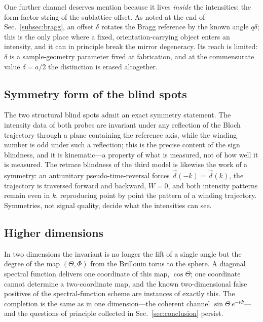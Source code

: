 \documentclass[onecolumn,aps,prl,superscriptaddress,longbibliography]{revtex4-2}
\begin{document}
One further channel deserves mention because it lives \emph{inside} the intensities: the form-factor string of the sublattice offset. As noted at the end of Sec.~\ref{subsec:bragg}, an offset $\delta$ rotates the Bragg reference by the known angle $q\delta$; this is the only place where a fixed, orientation-carrying object enters an intensity, and it can in principle break the mirror degeneracy. Its reach is limited: $\delta$ is a sample-geometry parameter fixed at fabrication, and at the commensurate value $\delta=a/2$ the distinction is erased altogether.

\subsection{Symmetry form of the blind spots}\label{subsec:symmetry}

The two structural blind spots admit an exact symmetry statement. The intensity data of both probes are invariant under any reflection of the Bloch trajectory through a plane containing the reference axis, while the winding number is odd under such a reflection; this is the precise content of the sign blindness, and it is kinematic---a property of what is measured, not of how well it is measured. The retrace blindness of the third model is likewise the work of a symmetry: an antiunitary pseudo-time-reversal forces $\vec d(-k)=\vec d(k)$, the trajectory is traversed forward and backward, $W=0$, and both intensity patterns remain even in $k$, reproducing point by point the pattern of a winding trajectory. Symmetries, not signal quality, decide what the intensities can see.

\subsection{Higher dimensions}\label{subsec:higher}

In two dimensions the invariant is no longer the lift of a single angle but the degree of the map $(\Theta,\Phi)$ from the Brillouin torus to the sphere. A diagonal spectral function delivers one coordinate of this map, $\cos\Theta$; one coordinate cannot determine a two-coordinate map, and the known two-dimensional false positives of the spectral-function scheme are instances of exactly this. The completion is the same as in one dimension---the coherent channel $\sin\Theta\,e^{-i\Phi}$---and the questions of principle collected in Sec.~\ref{sec:conclusion} persist.
\end{document}
